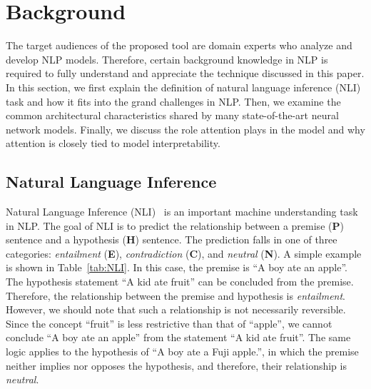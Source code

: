 \section{Background}
The target audiences of the proposed tool are domain experts who analyze and develop NLP models. Therefore, certain background knowledge in NLP is required to fully understand and appreciate the technique discussed in this paper. In this section, we first explain the definition of natural language inference (NLI) task and how it fits into the grand challenges in NLP. Then, we examine the common architectural characteristics shared by many state-of-the-art neural network models. Finally, we discuss the role attention plays in the model and why attention is closely tied to model interpretability.

\subsection{Natural Language Inference}
\label{sec:languageInference}
Natural Language Inference (NLI)~\cite{DaganRothSammons2013} is an important machine understanding task in NLP.
The goal of NLI is to predict the relationship between a premise (\textbf{P}) sentence and a hypothesis (\textbf{H}) sentence.
The prediction falls in one of three categories: \emph{entailment} (\textbf{E}), \emph{contradiction} (\textbf{C}), and \emph{neutral} (\textbf{N}).
A simple example is shown in Table~\ref{tab:NLI}.
In this case, the premise is ``A boy ate an apple''.
The hypothesis statement ``A kid ate fruit'' can be concluded from the premise. Therefore, the relationship between the premise and hypothesis is \emph{entailment}. However, we should note that such a relationship is not necessarily reversible. Since the concept ``fruit'' is less restrictive than that of ``apple'', we cannot conclude ``A boy ate an apple'' from the statement ``A kid ate fruit''. The same logic applies to the hypothesis of ``A boy ate a Fuji apple.'', in which the premise neither implies nor opposes the hypothesis, and therefore, their relationship is \emph{neutral}.

